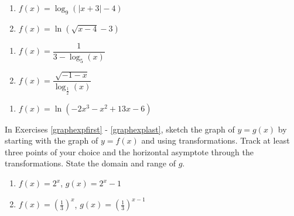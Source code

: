 \begin{multicols}{2}
\begin{enumerate}
\setcounter{enumi}{\value{HW}}

\item $f(x) = \log_{9}(|x + 3| - 4)$
\item $f(x) = \ln(\sqrt{x - 4} - 3)$

\setcounter{HW}{\value{enumi}}
\end{enumerate}
\end{multicols}

\begin{multicols}{2}
\begin{enumerate}
\setcounter{enumi}{\value{HW}}

\item $f(x) = \dfrac{1}{3 - \log_{5} (x)}$
\item $f(x) = \dfrac{\sqrt{-1 - x}}{\log_{\frac{1}{2}} (x)}$

\setcounter{HW}{\value{enumi}}
\end{enumerate}
\end{multicols}

\begin{multicols}{2}
\begin{enumerate}
\setcounter{enumi}{\value{HW}}

\item $f(x) = \ln(-2x^{3} - x^{2} + 13x - 6)$  \label{domainloglast}

\setcounter{HW}{\value{enumi}}
\end{enumerate}
\end{multicols}

In Exercises \ref{graphexpfirst} - \ref{graphexplast}, sketch the graph of $y=g(x)$ by starting with the graph of $y = f(x)$ and using transformations.  Track at least three points of your choice and the horizontal asymptote through the transformations. State the domain and range of $g$.

\begin{multicols}{2}
\begin{enumerate}
\setcounter{enumi}{\value{HW}}


\item  $f(x) = 2^{x}$, $g(x) = 2^{x} - 1$ \label{graphexpfirst}

\item  $f(x) = \left(\frac{1}{3}\right)^{x}$, $g(x) = \left(\frac{1}{3}\right)^{x-1}$

\setcounter{HW}{\value{enumi}}
\end{enumerate}
\end{multicols}


